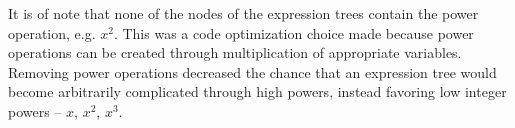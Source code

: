 It is of note that none of the nodes of the expression trees contain the power operation, e.g. $x^2$.  This was a code optimization choice made because power operations can be created through multiplication of appropriate variables.  Removing power operations decreased the chance that an expression tree would become arbitrarily complicated through high powers, instead favoring low integer powers -- $x$, $x^2$, $x^3$. \\

